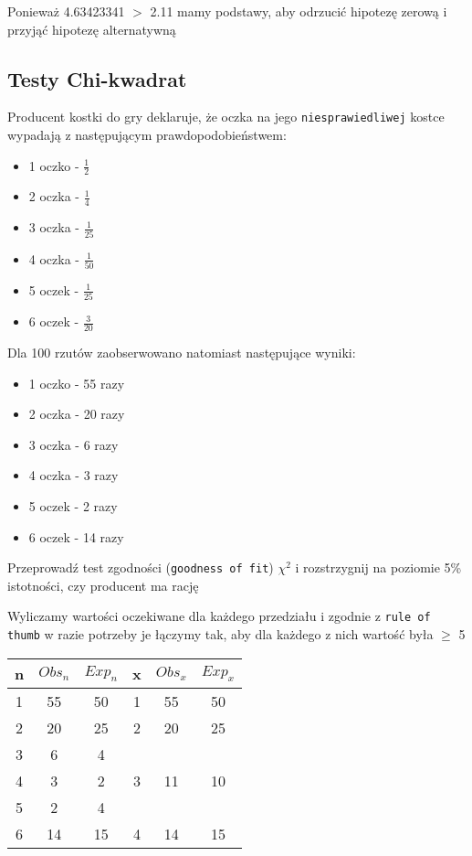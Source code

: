 \documentclass[main.tex]{subfiles}
\begin{document}
    Ponieważ 4.63423341 $>$ 2.11 mamy podstawy, aby odrzucić hipotezę zerową i przyjąć hipotezę alternatywną


    \subsection{Testy Chi-kwadrat}
    \begin{exercise}
        Producent kostki do gry deklaruje, że oczka na jego \texttt{niesprawiedliwej} kostce wypadają z następującym prawdopodobieństwem:
        \begin{itemize}
            \item 1 oczko - $\frac{1}{2}$
            \item 2 oczka - $\frac{1}{4}$
            \item 3 oczka - $\frac{1}{25}$
            \item 4 oczka - $\frac{1}{50}$
            \item 5 oczek - $\frac{1}{25}$
            \item 6 oczek - $\frac{3}{20}$
        \end{itemize}
        Dla 100 rzutów zaobserwowano natomiast następujące wyniki:
        \begin{itemize}
            \item 1 oczko - 55 razy
            \item 2 oczka - 20 razy
            \item 3 oczka - 6 razy
            \item 4 oczka - 3 razy
            \item 5 oczek - 2 razy
            \item 6 oczek - 14 razy
        \end{itemize}
        Przeprowadź test zgodności (\texttt{goodness of fit}) $\chi^{2}$ i rozstrzygnij na poziomie 5\% istotności, czy producent ma rację
    \end{exercise}

    Wyliczamy wartości oczekiwane dla każdego przedziału i zgodnie z \texttt{rule of thumb} w razie potrzeby je łączymy tak, aby dla każdego z nich wartość była $\geq$ 5

    \begin{table}[H]
        \centering
        \begin{tabular}{|c|c|c|c|c|c|}
            \hline
            n & $Obs_{n}$ & $Exp_{n}$ & x & $Obs_{x}$           & $Exp_{x}$           \\ \hline
            1 & 55 & 50 & 1 & 55 & 50                  \\ \hline
            2 & 20 & 25 & 2 & 20 & 25                  \\ \hline
            3 & 6 & 4 & \multirow{3}{*}{3} & \multirow{3}{*}{11} & \multirow{3}{*}{10} \\ \cline{1-3}
            4 & 3 & 2 & & &                     \\ \cline{1-3}
            5 & 2 & 4 & & &                     \\ \hline
            6 & 14 & 15 & 4 & 14 & 15                  \\ \hline
        \end{tabular}
    \end{table}
\end{document}
